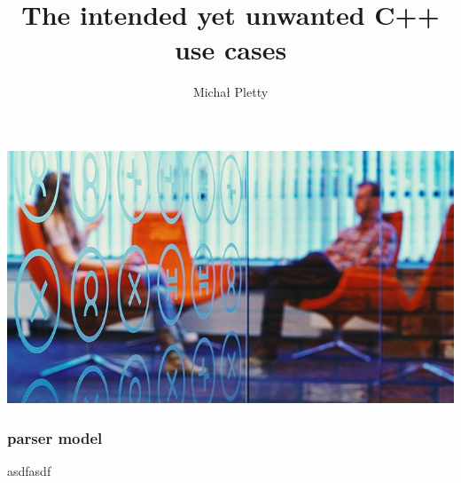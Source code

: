 \documentclass{beamer}
\title{The intended yet unwanted C++ use cases}
\author{Michał Pletty}
\begin{document}
\usebackgroundtemplate
{
    \includegraphics[width=\paperwidth,height=\paperheight]{background-chairs.jpg}
}

\begin{frame}
    \maketitle
\end{frame}

\usebackgroundtemplate
{
}

\begin{frame}
    \frametitle{parser model}

    asdfasdf

\end{frame}
\end{document}
